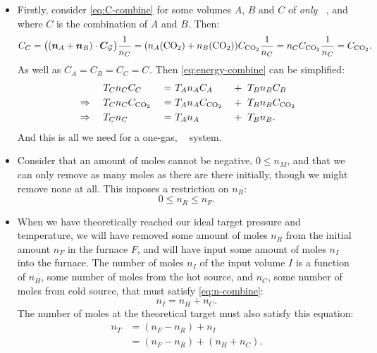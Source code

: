 \documentclass{article}
\DeclareMathOperator{\CDiox}{\mathrm{CO}_2}
\begin{document}
\begin{itemize}
    \item Firstly, consider \autoref{eq:C-combine} for some volumes $A$, $B$ and $C$ of \emph{only}
        $\CDiox$, and where $C$ is the combination of $A$ and $B$. Then:
        \[
            C_C
            = \big((\vec{n}_A+\vec{n}_B)\cdot\vec{C}_{\calG}\big)\frac{1}{n_C}
            = (n_A(\CDiox)+n_B(\CDiox))C_{\CDiox}\frac{1}{n_C}
            = n_C C_{\CDiox}\frac{1}{n_C}
            = C_{\CDiox}.
        \]
        As well as $C_A=C_B=C_C=C_{\CDiox}$. Then \autoref{eq:energy-combine} can be simplified:
        \begin{alignat}{4}
            &\phantom{\Rightarrow} &
            &\ T_C n_C C_C &
            \ = &\ T_A n_A C_A & &+\ T_B n_B C_B \notag \\
            &\Rightarrow &
            &\ T_C n_C C_{\CDiox} &
            \ = &\ T_A n_A C_{\CDiox} & &+\ T_B n_B C_{\CDiox} \notag \\
            &\Rightarrow &
            &\ T_C n_C &
            \ = &\ T_A n_A & &+\ T_B n_B.
            \label{eq:T-combine}
        \end{alignat}
        And this is all we need for a one-gas, $\CDiox$ system.

    \item Consider that an amount of moles cannot be negative, $0\le n_M$, and that we can
        only remove as many moles as there are there initially, though we might remove none at all.
        This imposes a restriction on $n_R$:
        \[
            0 \le n_R \le n_F.
        \]

    \item When we have theoretically reached our ideal target pressure and temperature, we will have
        removed some amount of moles $n_R$ from the initial amount $n_F$ in the furnace $F$, and
        will have input some amount of moles $n_I$ into the furnace. The number of moles $n_I$ of
        the input volume $I$ is a function of $n_H$, some number of moles from the hot source, and
        $n_C$, some number of moles from cold source, that must satisfy \autoref{eq:n-combine}:
        \[
            n_I = n_H + n_C.
        \]
        The number of moles at the theoretical target must also satisfy this equation:
        \begin{align*}
            n_T
            &= (n_F-n_R)+n_I \\
            &= (n_F-n_R)+(n_H + n_C).
        \end{align*}


\end{itemize}
\end{document}
